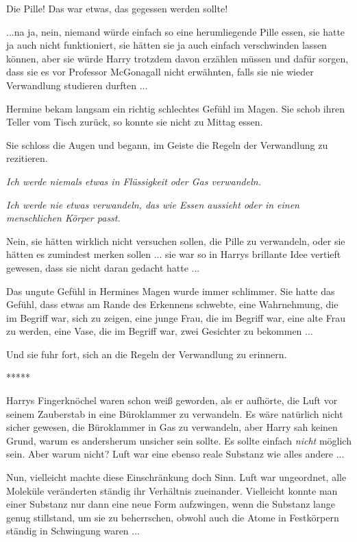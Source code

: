 Die Pille! Das war etwas, das gegessen werden sollte!

...na ja, nein, niemand würde einfach so eine herumliegende Pille essen, sie
hatte ja auch nicht funktioniert, sie hätten sie ja auch einfach verschwinden
lassen können, aber sie würde Harry trotzdem davon erzählen müssen und dafür
sorgen, dass sie es vor Professor McGonagall nicht erwähnten, falls sie nie
wieder Verwandlung studieren durften ...

Hermine bekam langsam ein richtig schlechtes Gefühl im Magen. Sie schob ihren
Teller vom Tisch zurück, so konnte sie nicht zu Mittag essen.

Sie schloss die Augen und begann, im Geiste die Regeln der Verwandlung zu
rezitieren.

\emph{\glqq{}Ich werde niemals etwas in Flüssigkeit oder Gas verwandeln.\grqq{}}

\emph{\glqq{}Ich werde nie etwas verwandeln, das wie Essen aussieht oder in
einen menschlichen Körper passt.\grqq{}}

Nein, sie hätten wirklich nicht versuchen sollen, die Pille zu verwandeln, oder
sie hätten es zumindest merken sollen ... sie war so in Harrys brillante Idee
vertieft gewesen, dass sie nicht daran gedacht hatte ...

Das ungute Gefühl in Hermines Magen wurde immer schlimmer. Sie hatte das Gefühl,
dass etwas am Rande des Erkennens schwebte, eine Wahrnehmung, die im Begriff
war, sich zu zeigen, eine junge Frau, die im Begriff war, eine alte Frau zu
werden, eine Vase, die im Begriff war, zwei Gesichter zu bekommen ...

Und sie fuhr fort, sich an die Regeln der Verwandlung zu erinnern.

\begin{center}*****\end{center}

Harrys Fingerknöchel waren schon weiß geworden, als er aufhörte, die Luft vor
seinem Zauberstab in eine Büroklammer zu verwandeln. Es wäre natürlich nicht
sicher gewesen, die Büroklammer in Gas zu verwandeln, aber Harry sah keinen
Grund, warum es andersherum unsicher sein sollte. Es sollte einfach \emph{nicht}
möglich sein. Aber warum nicht? Luft war eine ebenso reale Substanz wie alles
andere ...

Nun, vielleicht machte diese Einschränkung doch Sinn. Luft war ungeordnet, alle
Moleküle veränderten ständig ihr Verhältnis zueinander. Vielleicht konnte man
einer Substanz nur dann eine neue Form aufzwingen, wenn die Substanz lange genug
stillstand, um sie zu beherrschen, obwohl auch die Atome in Festkörpern ständig
in Schwingung waren ...

